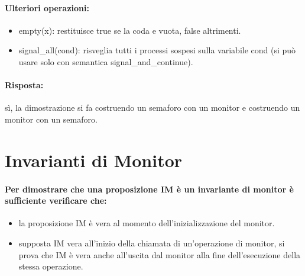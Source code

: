 \paragraph{Ulteriori operazioni:}

\begin{itemize}
	\item empty(x): restituisce true se la coda e vuota, false altrimenti.
	\item signal\_all(cond): risveglia tutti i processi sospesi sulla variabile cond (si può usare solo con semantica signal\_and\_continue).
\end{itemize}


\paragraph{Risposta:} sì, la dimostrazione si fa costruendo un semaforo con un monitor e costruendo un monitor con un semaforo.

\section{Invarianti di Monitor}



\paragraph{Per dimostrare che una proposizione IM è un invariante di monitor è sufficiente verificare che:}

\begin{itemize}
	\item {} la proposizione IM è vera al momento dell'inizializzazione del monitor.
	\item {} supposta IM vera all’inizio della chiamata di un’operazione di monitor, si prova che IM è vera anche all’uscita dal monitor alla fine dell’esecuzione della stessa operazione.
\end{itemize}

